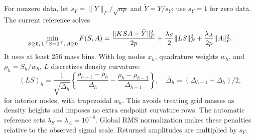 For nonzero data, let $s_Y=\|Y\|_F/\sqrt{np}$ and $\widetilde Y=Y/s_Y$; use $s_Y=1$ for zero data. The current reference solves
\begin{equation}\label{eq:mf}
 \min_{S\geq0,\,\mathbf{1}^\top S=\mathbf{1}^\top,\,A\geq0}
 F(S,A)=\frac{\|KSA-\widetilde Y\|_F^2}{2p}
 +\frac{\lambda_S}{2}\|LS\|_F^2+\frac{\lambda_A}{2p}\|A\|_F^2.
\end{equation}
It uses at least 256 mass bins. With log nodes $x_h$, quadrature weights $w_h$, and $\rho_h=S_h/w_h$, $L$ discretizes density curvature:
\begin{equation}\label{eq:mfcurvature}
 (LS)_h=\frac{1}{\sqrt{\overline\Delta_h}}
 \left\{\frac{\rho_{h+1}-\rho_h}{\Delta_h}
       -\frac{\rho_h-\rho_{h-1}}{\Delta_{h-1}}\right\},
 \quad \overline\Delta_h=(\Delta_{h-1}+\Delta_h)/2,
\end{equation}
for interior nodes, with trapezoidal $w_h$. This avoids treating grid masses as density heights and imposes no extra endpoint curvature rows. The automatic reference sets $\lambda_S=\lambda_A=10^{-8}$. Global RMS normalization makes these penalties relative to the observed signal scale. Returned amplitudes are multiplied by $s_Y$.

